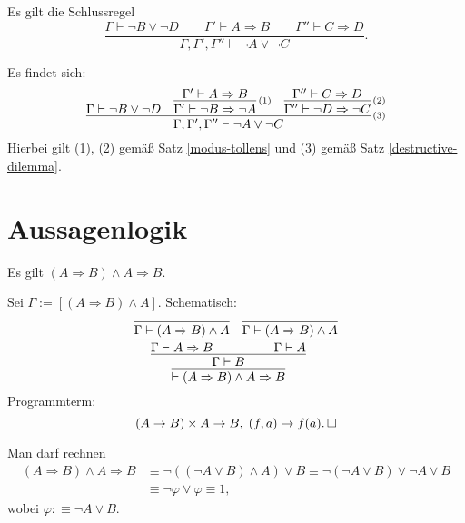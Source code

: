 \begin{Satz}
Es gilt die Schlussregel
\[\dfrac{\Gamma\vdash \neg B\lor \neg D\qquad
\Gamma'\vdash A\Rightarrow B\qquad\Gamma''\vdash C\Rightarrow D}{
\Gamma,\Gamma',\Gamma''\vdash \neg A\lor \neg C}.\]
\end{Satz}
\begin{Beweis}
Es findet sich:
\[
\infer[\infernote{(3)}]{\Gamma,\Gamma',\Gamma''\vdash \neg A\lor \neg C}{
  \Gamma\vdash \neg B\lor \neg D
  & \infer[\infernote{(1)}]{\Gamma'\vdash\neg B\Rightarrow\neg A}{
      \Gamma'\vdash A\Rightarrow B}
  & \infer[\infernote{(2)}]{\Gamma''\vdash\neg D\Rightarrow\neg C}{
      \Gamma''\vdash C\Rightarrow D}}
\]
Hierbei gilt (1), (2) gemäß Satz \ref{modus-tollens} und (3) gemäß Satz
\ref{destructive-dilemma}.\,\qedsymbol
\end{Beweis}

\newpage
\section{Aussagenlogik}

\begin{Satz}\newlinefirst
Es gilt $(A\Rightarrow B)\land A \Rightarrow B$.
\end{Satz}
\begin{Beweis}[Beweis 1]
Sei $\Gamma:=[(A\Rightarrow B)\land A]$. Schematisch:
\[\infer{\vdash (A\Rightarrow B)\land A\Rightarrow B}{
    \infer{\Gamma\vdash B}{
      \infer{\Gamma\vdash A\Rightarrow B}{
        \infer{\Gamma\vdash (A\Rightarrow B)\land A}{}}
      & \infer{\Gamma\vdash A}{
        \infer{\Gamma\vdash (A\Rightarrow B)\land A}{}}}}\]
Programmterm:
\[(A\to B)\times A\to B,\; (f, a)\mapsto f(a).\,\square\]
\end{Beweis}

\begin{Beweis}
Man darf rechnen
\begin{align*}
(A\Rightarrow B)\land A \Rightarrow B &\equiv
\neg ((\neg A\lor B)\land A) \lor B
\equiv\neg (\neg A\lor B) \lor \neg A \lor B\\
&\equiv \neg\varphi\lor\varphi\equiv 1,
\end{align*}
wobei $\varphi :\equiv \neg A\lor B$.\;\qedsymbol
\end{Beweis}


